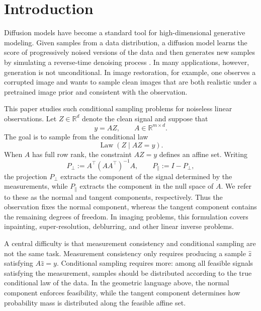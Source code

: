 \documentclass[twoside,11pt]{article}
\newcommand{\R}{\mathbb{R}}
\newcommand{\Law}{\operatorname{Law}}
\numberwithin{equation}{section}
\begin{document}
\section{Introduction}

Diffusion models have become a standard tool for high-dimensional generative
modeling. Given samples from a data distribution, a diffusion model learns the
score of progressively noised versions of the data and then generates new
samples by simulating a reverse-time denoising process
\citep{songermon2019score, ho2020ddpm, song2021scorebased, song2020ddim}.
In many applications, however, generation is not unconditional. In image
restoration, for example, one observes a corrupted image and wants to sample
clean images that are both realistic under a pretrained image prior and
consistent with the observation.

This paper studies such conditional sampling problems for noiseless linear
observations. Let \(Z\in\R^d\) denote the clean signal and suppose that
\[
    y=AZ,\qquad A\in\R^{m\times d}.
\]
The goal is to sample from the conditional law
\[
    \Law(Z\mid AZ=y).
\]
When \(A\) has full row rank, the constraint \(AZ=y\) defines an affine set.
Writing
\[
P_{\perp}:=A^\top(AA^\top)^{-1}A,
\qquad
P_{\parallel}:=I-P_{\perp},
\]
the projection \(P_\perp\) extracts the component of the signal determined by
the measurements, while \(P_\parallel\) extracts the component in the null space
of \(A\). We refer to these as the normal and tangent components, respectively.
Thus the observation fixes the normal component, whereas the tangent component
contains the remaining degrees of freedom. In imaging problems, this formulation
covers inpainting, super-resolution, deblurring, and other linear inverse
problems.

A central difficulty is that measurement consistency and conditional sampling
are not the same task. Measurement consistency only requires producing a sample
\(\hat z\) satisfying \(A\hat z=y\). Conditional sampling requires more: among
all feasible signals satisfying the measurement, samples should be distributed
according to the true conditional law of the data. In the geometric language
above, the normal component enforces feasibility, while the tangent component
determines how probability mass is distributed along the feasible affine set.
\end{document}
